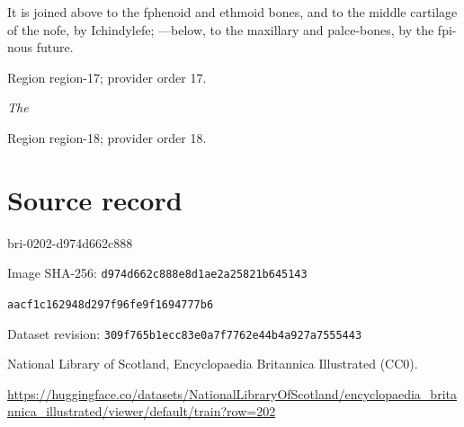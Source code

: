 \documentclass[11pt]{article}
\begin{document}
It is joined above to the fphenoid and ethmoid bones,
and to the middle cartilage of the nofe, by Ichindylefe;
—below, to the maxillary and palce-bones, by the fpi-
nous future.
\par

{\scriptsize\color{gray} Region region-17; provider order 17.\par}
\medskip

{\small\itshape The\par}

{\scriptsize\color{gray} Region region-18; provider order 18.\par}
\medskip
\newpage\section*{Source record}
bri-0202-d974d662c888\par
Image SHA-256: \texttt{d974d662c888e8d1ae2a25821b645143}\par\texttt{aacf1c162948d297f96fe9f1694777b6}\par
Dataset revision: \texttt{309f765b1ecc83e0a7f7}\texttt{762e44b4a927a7555443}\par
National Library of Scotland, Encyclopaedia Britannica Illustrated (CC0).\par
\url{https://huggingface.co/datasets/NationalLibraryOfScotland/encyclopaedia_britannica_illustrated/viewer/default/train?row=202}
\end{document}
